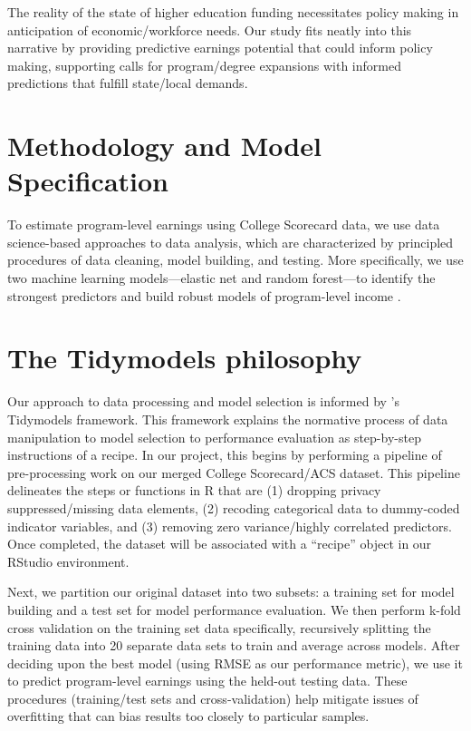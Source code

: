 \documentclass[a4paper, 12pt]{article}
\begin{document}
The reality of the state of higher education funding
necessitates policy making in anticipation of economic/workforce
needs. Our study fits neatly into this narrative by providing
predictive earnings potential that could inform policy making,
supporting calls for program/degree expansions with informed
predictions that fulfill state/local demands.

\section*{Methodology and Model Specification}

To estimate program-level earnings using College Scorecard data, we
use data science-based approaches to data analysis, which are
characterized by principled procedures of data cleaning, model
building, and testing. More specifically, we use two machine learning
models---elastic net and random forest---to identify the strongest
predictors and build robust models of program-level income
\parencite{Hastie_etal_2016, Kuhn_Silge_2022}.

\section*{The Tidymodels philosophy}

Our approach to data processing and model selection is informed by
\textcite{Kuhn_Silge_2022}'s Tidymodels framework. This framework
explains the normative process of data manipulation to model
selection to performance evaluation as step-by-step instructions of a
recipe. In our project, this begins by performing a pipeline of
pre-processing work on our merged College Scorecard/ACS dataset. This
pipeline delineates the steps or functions in R that are (1) dropping privacy
suppressed/missing data elements, (2) recoding categorical data to
dummy-coded indicator variables, and (3) removing zero variance/highly
correlated predictors. Once completed, the dataset will be associated
with a ``recipe'' object in our RStudio environment. 

Next, we partition our original dataset into two subsets: a training
set for model building and a test set for model performance
evaluation.  We then perform k-fold cross validation on the training
set data specifically, recursively splitting the training data into 20
separate data sets to train and average across models. After deciding
upon the best model (using RMSE as our performance metric), we use it
to predict program-level earnings using the held-out testing
data. These procedures (training/test sets  and cross-validation) help
mitigate issues of overfitting that can bias results too
closely to particular samples.
\end{document}
